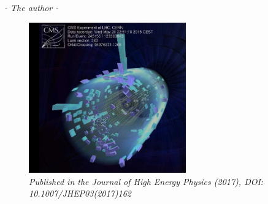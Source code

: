 \begin{flushright} \textit{- The author - } \end{flushright}
\begin{figure}[h!] 
    \centering
     \vspace*{10mm}
    \includegraphics[height=6.5cm]{figures/analysis/search1/misc/first_coll.png}
    \vspace*{10mm}
    \caption*{\footnotesize{\textit{Published in the Journal of High Energy Physics (2017), DOI: 10.1007/JHEP03(2017)162}}}
\end{figure}
\clearpage


